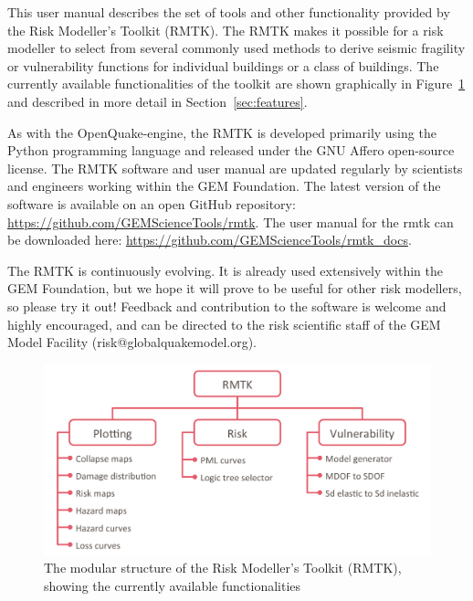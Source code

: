 This user manual describes the set of tools and other functionality provided by the Risk Modeller's Toolkit (RMTK). The RMTK makes it possible for a risk modeller to select from several commonly used methods to derive seismic fragility or vulnerability functions for individual buildings or a class of buildings. The currently available functionalities of the toolkit are shown graphically in Figure~\ref{fig:rmtk-structure} and described in more detail in Section~\ref{sec:features}.

As with the OpenQuake-engine, the RMTK is developed primarily using the Python programming language and released under the GNU Affero open-source license. The RMTK software and user manual are updated regularly by scientists and engineers working within the GEM Foundation. The latest version of the software is available on an open GitHub repository: \href{https://github.com/GEMScienceTools/rmtk}{https://github.com/GEMScienceTools/rmtk}. The user manual for the rmtk can be downloaded here: \href{https://github.com/GEMScienceTools/rmtk_docs}{https://github.com/GEMScienceTools/rmtk\_docs}.

The RMTK is continuously evolving. It is already used extensively within the GEM Foundation, but we hope it will prove to be useful for other risk modellers, so please try it out! Feedback and contribution to the software is welcome and highly encouraged, and can be directed to the risk scientific staff of the GEM Model Facility (risk@globalquakemodel.org).

\begin{figure}[!htbp]
	\centering
	\includegraphics[width=\textwidth]{figures/rmtk_structure.png}
	\caption{The modular structure of the Risk Modeller's Toolkit (RMTK), showing the currently available functionalities}
	\label{fig:rmtk-structure}
\end{figure}